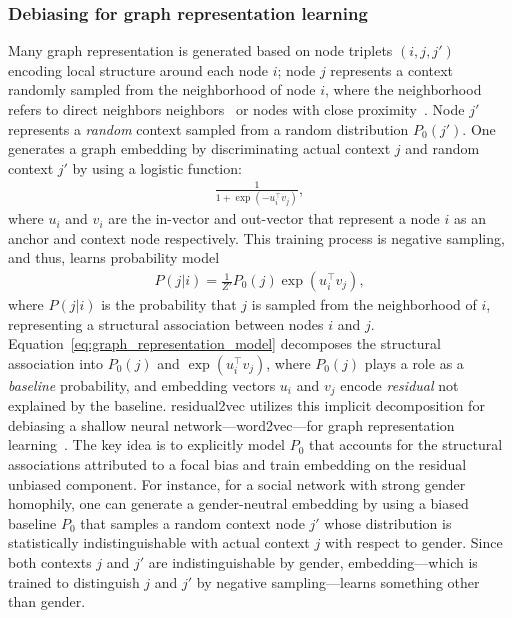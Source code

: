 \documentclass[sigconf,authordraft]{acmart}
\begin{document}
\subsubsection{Debiasing for graph representation learning}

Many graph representation is generated based on node triplets $(i,j,j')$ encoding local structure around each node $i$; node $j$ represents a context randomly sampled from the neighborhood of node $i$, where the neighborhood refers to direct neighbors neighbors~\cite{tangLINELargescaleInformation2015} or nodes with close proximity~\cite{perozziDeepWalkOnlineLearning2014,groverNode2vecScalableFeature2016}. Node $j'$ represents a \textit{random} context sampled from a random distribution $P_0(j')$.
One generates a graph embedding by discriminating actual context $j$ and random context $j'$ by using a logistic function:
\begin{align}
\frac{1}{1 + \exp(-u_i ^\top v_j)},
\end{align}
where $u_i$ and $v_i$ are the in-vector and out-vector that represent a node $i$ as an anchor and context node respectively.
This training process is negative sampling, and thus, learns probability model
\begin{align}
P(j \vert i) = \frac{1}{Z'}P_0(j)\exp\left(u_i ^\top v_j\right), \label{eq:graph_representation_model}
\end{align}
where $P(j\vert i)$ is the probability that $j$ is sampled from the neighborhood of $i$, representing a structural association between nodes $i$ and $j$. Equation~\ref{eq:graph_representation_model} decomposes the structural association into $P_0(j)$ and $\exp\left(u_i ^\top v_j\right)$, where $P_0(j)$ plays a role as a \textit{baseline} probability, and embedding vectors $u_i$ and $v_j$ encode \textit{residual} not explained by the baseline.
residual2vec utilizes this implicit decomposition for debiasing a shallow neural network---word2vec---for graph representation learning~\cite{kojaku_residual2vec_2021}.
The key idea is to explicitly model $P_0$ that accounts for the structural associations attributed to a focal bias and train embedding on the residual unbiased component.
For instance, for a social network with strong gender homophily, one can generate a gender-neutral embedding by using a biased baseline $P_0$ that samples a random context node $j'$ whose distribution is statistically indistinguishable with actual context $j$ with respect to gender. Since both contexts $j$ and $j'$ are indistinguishable by gender, embedding---which is trained to distinguish $j$ and $j'$ by negative sampling---learns something other than gender.
\end{document}
